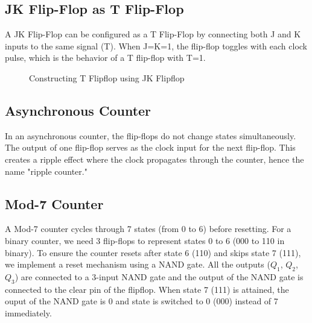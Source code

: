 \documentclass[12pt]{article}
\begin{document}
\subsection{JK Flip-Flop as T Flip-Flop}
A JK Flip-Flop can be configured as a T Flip-Flop by connecting both J and K inputs to the same signal (T). When J=K=1, the flip-flop toggles with each clock pulse, which is the behavior of a T flip-flop with T=1.

\begin{figure}[!ht]
\centering
{}%
\caption{Constructing T Flipflop using JK Flipflop}
\end{figure}
\FloatBarrier

\subsection{Asynchronous Counter}
In an asynchronous counter, the flip-flops do not change states simultaneously. The output of one flip-flop serves as the clock input for the next flip-flop. This creates a ripple effect where the clock propagates through the counter, hence the name "ripple counter."

\subsection{Mod-7 Counter}
A Mod-7 counter cycles through 7 states (from 0 to 6) before resetting. For a binary counter, we need 3 flip-flops to represent states 0 to 6 (000 to 110 in binary). To ensure the counter resets after state 6 (110) and skips state 7 (111), we implement a reset mechanism using a NAND gate.\newline 
All the outputs ($Q_1$, $Q_2$, $Q_3$) are connected to a 3-input NAND gate and the output of the NAND gate is connected to the clear pin of the flipflop. When state 7 (111) is attained, the ouput of the NAND gate is 0 and state is switched to 0 (000) instead of 7 immediately.
\end{document}
